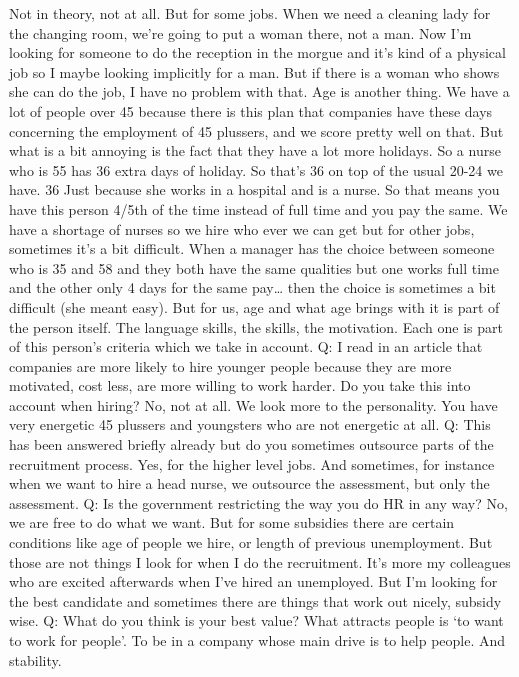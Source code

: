\documentclass[a4paper,fleqn,11pt,dvips,titlepage]{article}
\numberwithin{figure}{section}
\numberwithin{equation}{section}
\begin{document}
Not in theory, not at all. But for some jobs. When we need a cleaning lady for the changing room, we’re going to put a woman there, not a man. Now I’m looking for someone to do the reception in the morgue and it’s kind of a physical job so I maybe looking implicitly for a man. But if there is a woman who shows she can do the job, I have no problem with that. Age is another thing. We have a lot of people over 45 because there is this plan that companies have these days concerning the employment of 45 plussers, and we score pretty well on that. But what is a bit annoying is the fact that they have a lot more holidays. So a nurse who is 55 has 36 extra days of holiday. So that’s 36 on top of the usual 20-24 we have. 36 Just because she works in a hospital and is a nurse. So that means you have this person 4/5th of the time instead of full time and you pay the same. We have a shortage of nurses so we hire who ever we can get but for other jobs, sometimes it’s a bit difficult. When a manager has the choice between someone who is 35 and 58 and they both have the same qualities but one works full time and the other only 4 days for the same pay… then the choice is sometimes a bit difficult (she meant easy). But for us, age and what age brings with it is part of the person itself. The language skills, the skills, the motivation. Each one is part of this person’s criteria which we take in account. 
Q: I read in an article that companies are more likely to hire younger people because they are more motivated, cost less, are more willing to work harder. Do you take this into account when hiring?
No, not at all. We look more to the personality. You have very energetic 45 plussers and youngsters who are not energetic at all. 
Q: This has been answered briefly already but do you sometimes outsource parts of the recruitment process. 
Yes, for the higher level jobs. And sometimes, for instance when we want to hire a head nurse, we outsource the assessment, but only the assessment. 
Q: Is the government restricting the way you do HR in any way?
No, we are free to do what we want. But for some subsidies there are certain conditions like age of people we hire, or length of previous unemployment. But those are not things I look for when I do the recruitment. It’s more my colleagues who are excited afterwards when I’ve hired an unemployed. But I’m looking for the best candidate and sometimes there are things that work out nicely, subsidy wise. 
Q: What do you think is your best value?
What attracts people is ‘to want to work for people’. To be in a company whose main drive is to help people. And stability. 
\end{document}
